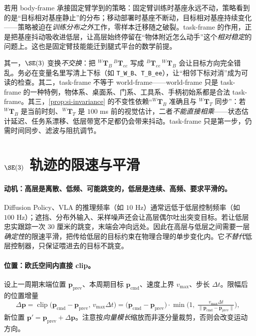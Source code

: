 \begin{insight}
若用 body-frame 承接固定臂学到的策略：固定臂训练时基座永远不动，策略看到的是“目标相对基座静止”的分布；移动部署时基座不断动，目标相对基座持续变化——策略被迫在\emph{训练分布之外}工作，零样本迁移随之破裂。task-frame 的作用，正是把基座抖动吸收进低层，让高层始终停留在“物体附近怎么动手”这个\emph{相对稳定}的问题上。这也是固定臂技能能迁到腿式平台的数学前提。
\end{insight}

\begin{pitfall}[左右乘顺序写反 / 误以为 task-frame $=$ world-frame / 误以为 task-frame 能消除一切抖动]
其一，$\SE(3)$ 变换\emph{不交换}：把 ${}^{W}\mathbf{T}_{B}\,{}^{B}\mathbf{T}_{ee}$ 写成 ${}^{B}\mathbf{T}_{ee}\,{}^{W}\mathbf{T}_{B}$ 会让目标方向完全错乱。务必在变量名里写清上下标（如 \verb|T_W_B|、\verb|T_B_ee|），让“相邻下标对消”成为可读的检查。其二，task-frame 不等于 world-frame——world-frame 只是 task-frame 的一种特例，物体系、桌面系、门系、工具系、手柄初始系都是合法 task-frame。其三，\cref{prop:si-invariance} 的不变性依赖“${}^{W}\mathbf{T}_{B}$ 准确且与 ${}^{W}\mathbf{T}_{T}$ 同步”：若 ${}^{W}\mathbf{T}_{B}$ 是当前时刻、${}^{W}\mathbf{T}_{T}$ 是 $100$ ms 前的视觉估计，二者\emph{不能直接相乘}——状态估计延迟、任务系漂移、低层带宽不足都仍会带来抖动。task-frame 只是第一步，仍需时间同步、滤波与阻抗调节。
\end{pitfall}

\section{\texorpdfstring{$\SE(3)$}{SE(3)} 轨迹的限速与平滑}
\label{sec:si-smooth}

\paragraph{动机：高层是离散、低频、可能跳变的，低层是连续、高频、要求平滑的。}
Diffusion Policy、VLA 的推理频率（如 $10$ Hz）通常远低于低层控制频率（如 $100$ Hz）；遮挡、分布外输入、采样噪声还会让高层偶尔吐出突变目标。若让低层忠实跟踪一次 $30$ 厘米的跳变，末端会冲向远处。因此在高层与低层之间需要一层\emph{确定性}的限速平滑，把传给低层的目标约束在物理合理的单步变化内。它\emph{不替代}低层控制器，只保证喂进去的目标不跳变。

\paragraph{位置：欧氏空间内直接 clip。}
设上一周期末端位置 $\mathbf p_{\mathrm{prev}}$、本周期目标 $\mathbf p_{\mathrm{cmd}}$、速度上界 $v_{\max}$、步长 $\Delta t$。限幅后的位置增量
\begin{equation}
  \Delta\mathbf p=\operatorname{clip}\big(\mathbf p_{\mathrm{cmd}}-\mathbf p_{\mathrm{prev}},\,v_{\max}\Delta t\big)
  =\big(\mathbf p_{\mathrm{cmd}}-\mathbf p_{\mathrm{prev}}\big)\cdot\min\!\Big(1,\;\tfrac{v_{\max}\Delta t}{\|\mathbf p_{\mathrm{cmd}}-\mathbf p_{\mathrm{prev}}\|}\Big),
  \label{eq:si-poslimit}
\end{equation}
新位置 $\mathbf p'=\mathbf p_{\mathrm{prev}}+\Delta\mathbf p$。注意按\emph{向量模长}缩放而非逐分量裁剪，否则会改变运动方向。

